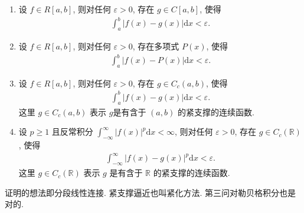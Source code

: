 \documentclass[../../main.tex]{subfiles}%
\begin{document}
\begin{theorem}[可积被连续函数逼近]\label{theorem:可积被连续函数逼近}
\begin{enumerate}[(1)]
\item\label{theorem:可积被连续函数逼近-1} 设 $f \in R[a,b]$, 则对任何 $\varepsilon > 0$, 存在 $g \in C[a,b]$, 使得
\begin{align*}
\int_{a}^{b} |f(x) - g(x)|\mathrm{d}x < \varepsilon. 
\end{align*}

\item\label{theorem:可积被连续函数逼近-2} 设 $f \in R[a,b]$, 则对任何 $\varepsilon > 0$, 存在多项式 $P(x)$, 使得
\begin{align*}
\int_{a}^{b} |f(x) - P(x)|\mathrm{d}x < \varepsilon. 
\end{align*}

\item\label{theorem:可积被连续函数逼近-3} 设 $f \in R[a,b]$, 则对任何 $\varepsilon > 0$, 存在 $g \in C_c(a,b)$, 使得
\begin{align*}
\int_{a}^{b} |f(x) - g(x)|\mathrm{d}x < \varepsilon. 
\end{align*}
这里 $g\in C_c(a,b)$ 表示 $g$是有含于 $(a,b)$ 的紧支撑的连续函数.

\item\label{theorem:可积被连续函数逼近-4} 设 $p \geqslant 1$ 且反常积分 $\int_{-\infty}^{\infty} |f(x)|^{p}\mathrm{d}x < \infty$, 则对任何 $\varepsilon > 0$, 存在 $g \in C_c(\mathbb{R})$, 使得
\begin{align*}
\int_{-\infty}^{\infty} |f(x) - g(x)|^{p}\mathrm{d}x < \varepsilon.
\end{align*}
这里 $g\in C_c(\mathbb{R})$ 表示 $g$ 是有含于 $\mathbb{R}$ 的紧支撑的连续函数.
\end{enumerate}
\end{theorem}
\begin{note}
证明的想法即分段线性连接. 紧支撑逼近也叫紧化方法. 第三问对勒贝格积分也是对的.
\end{note}
\end{document}
